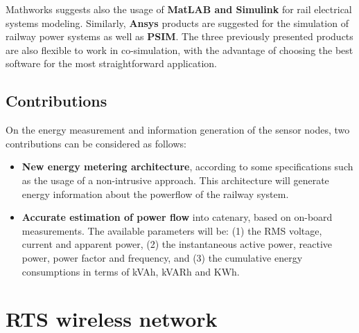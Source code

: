 Mathworks suggests also the usage of \textbf{MatLAB and Simulink} for rail electrical systems modeling. 
Similarly, \textbf{Ansys} products are suggested for the simulation of railway power systems as well as \textbf{PSIM}. The three previously presented products are also flexible to work in co-simulation, with the advantage of choosing the best software for the most straightforward application.


	\subsection{Contributions}
	
	On the energy measurement and information generation of the sensor nodes, two contributions can be considered as follows:
	
	\begin{itemize}
		\setlength\itemsep{0em}
		
		\item \textbf{New energy metering architecture}, according to some specifications such as the usage of a non-intrusive approach.
		This architecture will generate energy information about the powerflow of the railway system.
		
		\item \textbf{Accurate estimation of power flow} into catenary, based on on-board measurements. The available parameters will be: (1) the RMS voltage, current and apparent power, (2) the instantaneous active power, reactive power, power factor and frequency, and (3) the cumulative energy consumptions in terms of kVAh, kVARh and KWh.
		
		
	\end{itemize}

%		
%		
	

\section{\ac{RTS} wireless network}
\label{sec:43}

